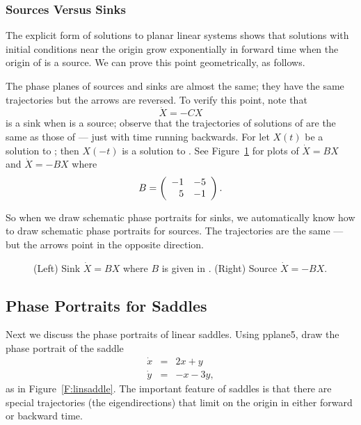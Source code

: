 \documentclass{ximera}
\begin{document}
\subsubsection*{Sources Versus Sinks}

The explicit form of solutions to planar linear systems shows that solutions
with initial conditions near the origin grow exponentially in forward time
when the origin of  is a source.  We can prove this point
geometrically, as follows.

The phase planes of sources and sinks are almost the same; they have the
same trajectories but the arrows are reversed.  To verify this point, note
that
\begin{equation}  \label{e:C3}
\dot{X}=-CX
\end{equation}
is a sink when  is a source; observe that the trajectories of
solutions of  are the same as those of  --- just with
time running backwards.  For let $X(t)$ be a solution to ; then
$X(-t)$ is a solution to .   See Figure~\ref{F:SS} for plots of
$\dot{X}=BX$ and $\dot{X}=-BX$ where
\begin{equation}  \label{E:SS}
B = \left(\begin{array}{rr} -1 & -5\\ 5 &-1\end{array}\right).
\end{equation}

So when we draw schematic phase portraits
for sinks, we automatically know
how to draw schematic phase portraits for
sources.  The trajectories are
the same --- but the arrows point in the opposite direction.

\begin{figure}[htb]
           \centerline{%
           }
           \caption{(Left) Sink $\dot{X}=BX$ where $B$ is given in
.  (Right) Source $\dot{X}=-BX$.}
           \label{F:SS}
\end{figure}


\subsection*{Phase Portraits for Saddles}

Next we discuss the phase portraits of linear saddles.  Using
{\sf pplane5}, draw the phase portrait
of the saddle
\begin{equation}  \label{e:saddlet}
\begin{array}{rcl}
\dot{x} & = & 2x+y\\
\dot{y} & = & -x-3y,
\end{array}
\end{equation}
as in Figure~\ref{F:linsaddle}.  The important feature of saddles
is that there are special trajectories (the eigendirections) that
limit on the origin in either forward or backward time.
\end{document}
